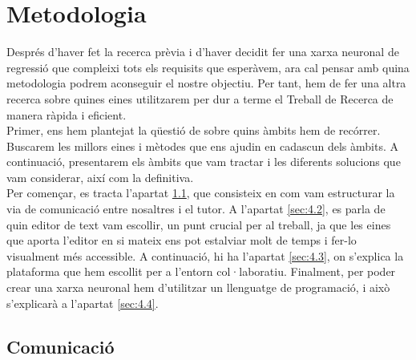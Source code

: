 \chapter{Metodologia}

\label{c:Metodologia}

Després d'haver fet la recerca prèvia i d'haver decidit fer una xarxa neuronal de regressió que compleixi tots els requisits que esperàvem, ara cal pensar amb quina metodologia podrem aconseguir el nostre objectiu. Per tant, hem de fer una altra recerca sobre quines eines utilitzarem per dur a terme el Treball de Recerca de manera ràpida i eficient.\\

Primer, ens hem plantejat la qüestió de sobre quins àmbits hem de recórrer. Buscarem les millors eines i mètodes que ens ajudin en cadascun dels àmbits. A continuació, presentarem els àmbits que vam tractar i les diferents solucions que vam considerar, així com la definitiva.\\

Per començar, es tracta l'apartat \ref{sec:4.1}, que consisteix en com vam estructurar la via de comunicació entre nosaltres i el tutor. A l'apartat \ref{sec:4.2}, es parla de quin editor de text vam escollir, un punt crucial per al treball, ja que les eines que aporta l'editor en si mateix ens pot estalviar molt de temps i fer-lo visualment més accessible. A continuació, hi ha l'apartat \ref{sec:4.3}, on s'explica la plataforma que hem escollit per a l'entorn col·laboratiu. Finalment, per poder crear una xarxa neuronal hem d'utilitzar un llenguatge de programació, i això s'explicarà a l'apartat \ref{sec:4.4}.

\section{Comunicació} \label{sec:4.1}

